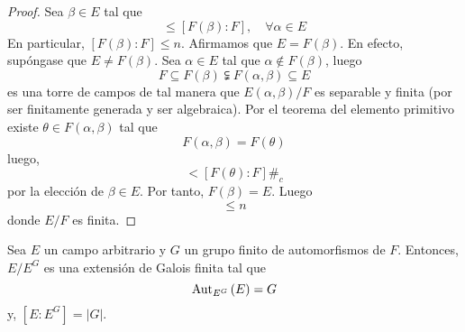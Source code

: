 \documentclass[12pt]{report}
\theoremstyle{largebreak}
\newcommand\abs[1]{\ensuremath{\left|#1\right|}}
\newcommand\contradiction{\ensuremath{\#_c}}
\begin{document}
    \begin{proof}
        Sea $\beta\in E$ tal que
        \begin{equation*}
            [F(\alpha):F]\leq [F(\beta):F],\quad\forall\alpha\in E
        \end{equation*}
        En particular, $[F(\beta):F]\leq n$. Afirmamos que $E=F(\beta)$. En efecto, supóngase que $E\neq F(\beta)$. Sea $\alpha\in E$ tal que $\alpha\notin F(\beta)$, luego
        \begin{equation*}
            F\subseteq F(\beta)\subsetneqq F(\alpha,\beta)\subseteq E
        \end{equation*}
        es una torre de campos de tal manera que $E(\alpha,\beta)/F$ es separable y finita (por ser finitamente generada y ser algebraica). Por el teorema del elemento primitivo existe $\theta\in F(\alpha,\beta)$ tal que
        \begin{equation*}
            F(\alpha,\beta)=F(\theta)
        \end{equation*}
        luego,
        \begin{equation*}
            [F(\beta):F]<[F(\theta):F]\contradiction
        \end{equation*}
        por la elección de $\beta\in E$. Por tanto, $F(\beta)=E$. Luego
        \begin{equation*}
            [E:F]\leq n
        \end{equation*}
        donde $E/F$ es finita.
    \end{proof}

    \begin{theor}
        Sea $E$ un campo arbitrario y $G$ un grupo finito de automorfismos de $F$. Entonces, $E/E^G$ es una extensión de Galois finita tal que
        \begin{equation*}
            \textup{Aut}_{E^G}\left(E\right)=G
        \end{equation*}
        y, $[E:E^G]=\abs{G}$.
    \end{theor}
\end{document}
